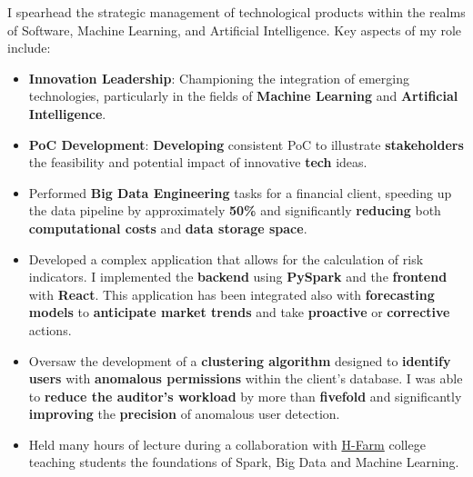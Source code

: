 \documentclass[10pt,a4paper]{altacv}
\begin{document}


     I spearhead the strategic management of technological products within the realms of Software, Machine Learning, and Artificial Intelligence. Key aspects of my role include:
     \begin{itemize}
         \item \textbf{Innovation Leadership}: Championing the integration of emerging technologies, particularly in the fields of \textbf{Machine Learning} and \textbf{Artificial Intelligence}.
         \item \textbf{PoC Development}: \textbf{Developing} consistent PoC to illustrate \textbf{stakeholders} the feasibility and potential impact of innovative \textbf{tech} ideas.
     \end{itemize}


    \begin{itemize}
        \item Performed \textbf{Big Data Engineering} tasks for a financial client, speeding up the data pipeline by approximately \textbf{50\% }and significantly \textbf{reducing}                both \textbf{computational costs} and \textbf{data storage space}.
    \end{itemize}
    \begin{itemize}
        \item Developed a complex application that allows for the calculation of risk indicators. I implemented the \textbf{backend} using \textbf{PySpark} and the \textbf{frontend} with \textbf{React}. This application has been integrated also with \textbf{forecasting models} to \textbf{anticipate market trends} and take \textbf{proactive} or \textbf{corrective} actions.
    \end{itemize}
    
    \begin{itemize}
        \item Oversaw the development of a \textbf{clustering algorithm} designed to \textbf{identify users} with \textbf{anomalous permissions} within the client's database. I was able to \textbf{reduce the auditor's workload} by more than \textbf{fivefold} and significantly \textbf{improving} the \textbf{precision} of anomalous user detection.
        \item Held many hours of lecture during a collaboration with \href{https://www.h-farm.com/it}{H-Farm} college teaching students the foundations of Spark, Big Data and Machine Learning.
    \end{itemize}
    
\end{document}
